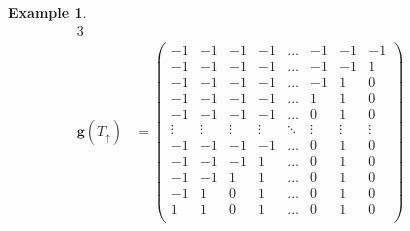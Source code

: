 \documentclass{amsart}
\theoremstyle{definition}
\newtheorem{example}[theorem]{Example}
\renewcommand{\b}[1]{{\boldsymbol{#1}}} %
\begin{document}
\begin{example}
\begin{table}[p]
\begin{alignat*}{3}
	\\[.3cm]
	\b{g}(T_\uparrow) & = \begin{pmatrix}
		-1 & -1 & -1 & -1 & \dots & -1 & -1 & -1 \\
		-1 & -1 & -1 & -1 & \dots & -1 & -1 & 1 \\
		-1 & -1 & -1 & -1 & \dots & -1 & 1 & 0 \\
		-1 & -1 & -1 & -1 & \dots & 1 & 1 & 0 \\
		-1 & -1 & -1 & -1 & \dots & 0 & 1 & 0 \\
		\vdots & \vdots & \vdots & \vdots & \ddots & \vdots & \vdots & \vdots \\
		-1 & -1 & -1 & -1 & \dots & 0 & 1 & 0 \\
		-1 & -1 & -1 & 1 & \dots & 0 & 1 & 0 \\
		-1 & -1 & 1 & 1 & \dots & 0 & 1 & 0 \\
		-1 & 1 & 0 & 1 & \dots & 0 & 1 & 0 \\
		1 & 1 & 0 & 1 & \dots & 0 & 1 & 0 \\
	\end{pmatrix}
	\qquad &

\end{alignat*}
\end{table}
\end{example}
\end{document}
